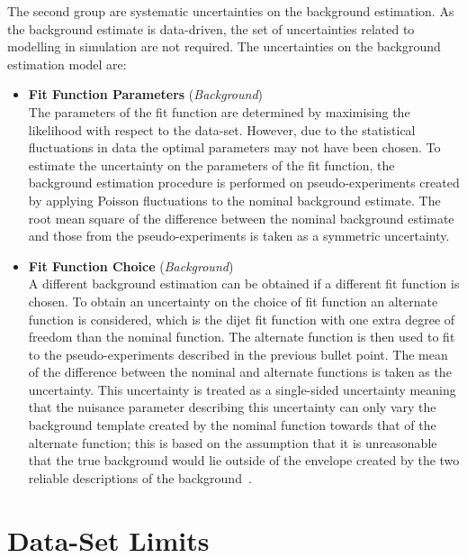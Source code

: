 \vspace{-0.3em}
The second group are systematic uncertainties on the background estimation.
As the background estimate is data-driven, the set of uncertainties related to modelling in simulation are not required.
The uncertainties on the background estimation model are:
\vspace{-0.3em}
\begin{itemize}[leftmargin=*]
\item \textbf{Fit Function Parameters} \hspace{1mm} (\textit{Background})\\
  The parameters of the fit function are determined by maximising the likelihood with respect to the data-set.
  However, due to the statistical fluctuations in data the optimal parameters
  may not have been chosen.
  To estimate the uncertainty on the parameters of the fit function,
  the background estimation procedure is performed on pseudo-experiments created by applying Poisson fluctuations to the nominal background estimate.
  The root mean square of the difference between the nominal background estimate and those from the pseudo-experiments is taken as a symmetric uncertainty. \vspace{0.3em}
\item\textbf{Fit Function Choice}  \hspace{1mm} (\textit{Background})\\
  A different background estimation can be obtained if a different fit function is chosen.
  To obtain an uncertainty on the choice of fit function an alternate function is considered,
  which is the dijet fit function with one extra degree of freedom than the nominal function.
  The alternate function is then used to fit to the pseudo-experiments described in the previous bullet point.
  The mean of the difference between the nominal and alternate functions is taken as the uncertainty.
  This uncertainty is treated as a single-sided uncertainty
  meaning that the nuisance parameter describing this uncertainty can
  only vary the background template created by the nominal function towards that of the alternate function;
  this is based on the assumption that it is unreasonable that the true background
  would lie outside of the envelope created by the two reliable descriptions of the background~\cite{dijet-mori16_paper}.
\end{itemize}

\section{\summer{} Data-Set Limits}
\label{sec:lim-summer}

